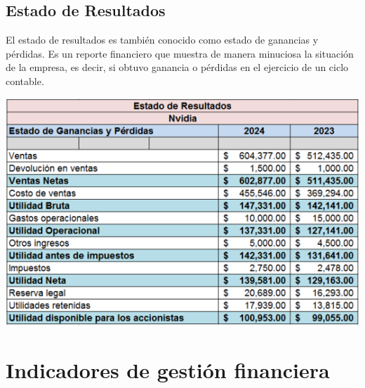\documentclass{article}
\begin{document}
\subsection{Estado de Resultados}

El estado de resultados es también conocido como estado de ganancias y pérdidas. Es un reporte financiero que muestra de manera minuciosa la situación de la empresa, es decir, si obtuvo ganancia o pérdidas en el ejercicio de un ciclo contable.

\begin{center}
  \includegraphics[width=15cm]{./assets/estado_resultados.png}
\end{center}

\newpage

\section{Indicadores de gestión financiera}
\end{document}
